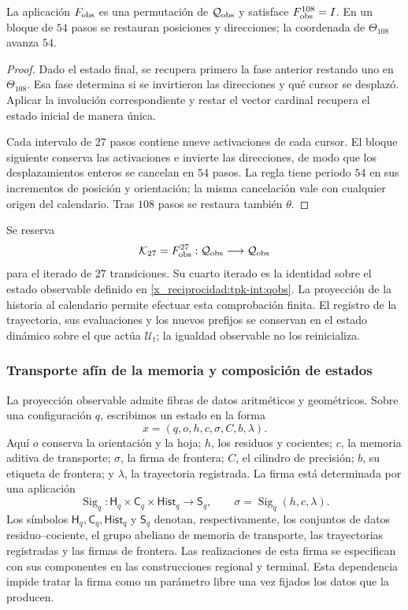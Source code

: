 \begin{proposition}
\label{x_reciprocidad:tpk-int:periodo}
La aplicación \(F_{\rm obs}\) es una permutación de
\(\mathcal Q_{\rm obs}\) y satisface \(F_{\rm obs}^{108}=I\).
En un bloque de \(54\) pasos se restauran posiciones y direcciones;
la coordenada de \(\Theta_{108}\) avanza \(54\).
\end{proposition}
\begin{proof}
Dado el estado final, se recupera primero la fase anterior restando uno
en \(\Theta_{108}\). Esa fase determina si se invirtieron las
direcciones y qué cursor se desplazó. Aplicar la involución correspondiente
y restar el vector cardinal recupera el estado inicial de manera única.

Cada intervalo de \(27\) pasos contiene nueve activaciones de cada
cursor. El bloque siguiente conserva las activaciones e invierte las
direcciones, de modo que los desplazamientos enteros se cancelan en
\(54\) pasos. La regla tiene periodo \(54\) en sus incrementos de
posición y orientación; la misma cancelación vale con cualquier origen
del calendario. Tras \(108\) pasos se restaura también \(\theta\).
\end{proof}

Se reserva
\[
 \mathcal K_{27}=F_{\rm obs}^{27}:
 \mathcal Q_{\rm obs}\longrightarrow\mathcal Q_{\rm obs}
\]
para el iterado de \(27\) transiciones. Su cuarto iterado es la
identidad sobre el estado observable definido en \eqref{x_reciprocidad:tpk-int:qobs}.
La proyección de la historia al calendario permite efectuar esta
comprobación finita. El registro de la trayectoria, sus evaluaciones y
los nuevos prefijos se conservan en el estado dinámico sobre el que
actúa \(\mathcal U_t\); la igualdad observable no los reinicializa.

\subsubsection{Transporte afín de la memoria y composición de estados}
\label{x_reciprocidad:tpk-int:memoria}

La proyección observable admite fibras de datos aritméticos y geométricos.
Sobre una configuración \(q\), escribimos un estado en la forma
\[
 x=(q,o,h,c,\sigma,C,b,\lambda).
\]
Aquí \(o\) conserva la orientación y la hoja; \(h\), los residuos
y cocientes; \(c\), la memoria aditiva de transporte; \(\sigma\),
la firma de frontera; \(C\), el cilindro de precisión; \(b\), su
etiqueta de frontera; y \(\lambda\), la trayectoria registrada. La
firma está determinada por una aplicación
\[
 \operatorname{Sig}_q:
 \mathsf H_q\times\mathsf C_q\times\mathsf{Hist}_q
 \longrightarrow\mathsf S_q,
 \qquad \sigma=\operatorname{Sig}_q(h,c,\lambda).
\]
Los símbolos \(\mathsf H_q,\mathsf C_q,\mathsf{Hist}_q\) y
\(\mathsf S_q\) denotan, respectivamente, los conjuntos de datos
residuo--cociente, el grupo abeliano de memoria de transporte, las
trayectorias registradas y las firmas de frontera.
Las realizaciones de esta firma se especifican con sus componentes en
las construcciones regional y terminal. Esta dependencia impide tratar
la firma como un parámetro libre una vez fijados los datos que la producen.


